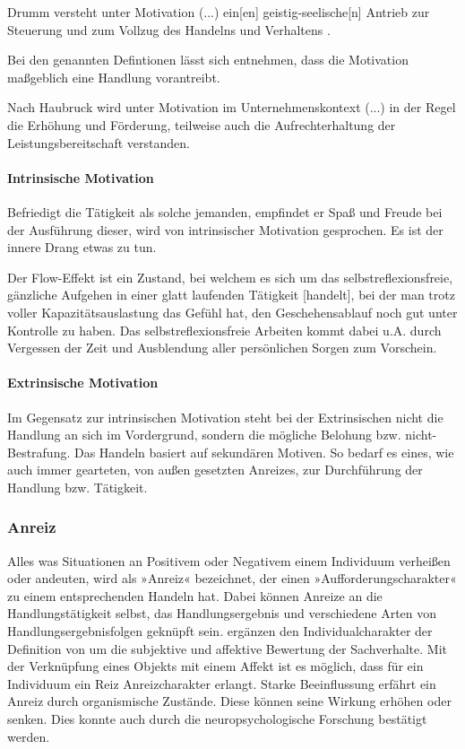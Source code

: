 Drumm versteht \glqq unter Motivation (...) ein[en] geistig-seelische[n] Antrieb zur Steuerung und zum Vollzug des Handelns und Verhaltens \grqq. \citep[S. 384]{Drumm.2008}

Bei den genannten Defintionen lässt sich entnehmen, dass die Motivation maßgeblich eine Handlung vorantreibt. 

Nach Haubruck wird unter Motivation \glqq im Unternehmenskontext (...) in der Regel die Erhöhung und Förderung, teilweise auch die Aufrechterhaltung der Leistungsbereitschaft verstanden.\grqq \citep[S. 109]{Haubrock.2009}

\paragraph{Intrinsische Motivation}
Befriedigt die Tätigkeit als solche jemanden, empfindet er Spaß und Freude bei der Ausführung dieser, wird von intrinsischer Motivation gesprochen. Es ist der innere Drang etwas zu tun. \citep[S. 40f]{Nowka.2013} 

Der Flow-Effekt ist ein Zustand, bei welchem \glqq […] es sich um das selbstreflexionsfreie, gänzliche Aufgehen in einer glatt laufenden Tätigkeit [handelt], bei der man trotz voller Kapazitätsauslastung das Gefühl hat, den Geschehensablauf noch gut unter Kontrolle zu haben\grqq. \citep[S. 380]{Rheinberg.2010} 
Das selbstreflexionsfreie Arbeiten kommt dabei u.A. durch Vergessen der Zeit und Ausblendung aller persönlichen Sorgen zum Vorschein. 

\paragraph{Extrinsische Motivation}
Im Gegensatz zur intrinsischen Motivation steht bei der Extrinsischen nicht die Handlung an sich im Vordergrund, sondern die mögliche Belohung bzw. nicht-Bestrafung. Das Handeln basiert auf sekundären Motiven. So bedarf es eines, wie auch immer gearteten, von außen gesetzten Anreizes, zur Durchführung der Handlung bzw. Tätigkeit. \citep[S. 41f]{Nowka.2013}

\subsubsection{Anreiz}
\glqq Alles was Situationen an Positivem oder Negativem einem Individuum verheißen oder andeuten, wird als »Anreiz« bezeichnet, der einen »Aufforderungscharakter« zu einem entsprechenden Handeln hat. Dabei können Anreize an die Handlungstätigkeit selbst, das Handlungsergebnis und verschiedene Arten von Handlungsergebnisfolgen geknüpft sein.\grqq \citep[S. 5]{Heckhausen.2010b}
\citet[S. 106]{Beckmann.2010} ergänzen den Individualcharakter der Definition von \citet[S. 106]{Heckhausen.2010b} um die subjektive und affektive Bewertung der Sachverhalte. Mit der Verknüpfung eines Objekts mit einem Affekt ist es möglich, dass für ein Individuum ein Reiz Anreizcharakter erlangt. Starke Beeinflussung erfährt ein Anreiz durch organismische Zustände. Diese können seine Wirkung erhöhen oder senken. Dies konnte auch durch die neuropsychologische Forschung bestätigt werden. \citep[S. 106f]{Heckhausen.2010b}

